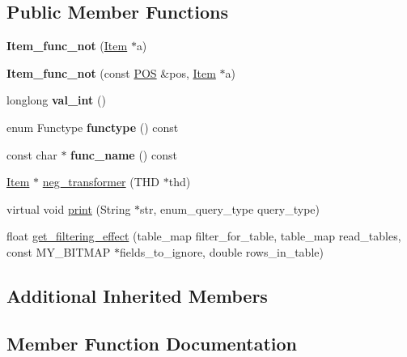 \subsection*{Public Member Functions}
\begin{DoxyCompactItemize}
\item 
\mbox{\label{classItem__func__not_a974b3e4bde716bd123b0055aacda011c}} 
{\bfseries Item\+\_\+func\+\_\+not} (\mbox{\hyperlink{classItem}{Item}} $\ast$a)
\item 
\mbox{\label{classItem__func__not_af71818c007710aac8b45670aa3038132}} 
{\bfseries Item\+\_\+func\+\_\+not} (const \mbox{\hyperlink{structYYLTYPE}{P\+OS}} \&pos, \mbox{\hyperlink{classItem}{Item}} $\ast$a)
\item 
\mbox{\label{classItem__func__not_af869072115f6ec06d7de76e80330aec5}} 
longlong {\bfseries val\+\_\+int} ()
\item 
\mbox{\label{classItem__func__not_a13182e0a3f186bf935e970a76a7a3ea6}} 
enum Functype {\bfseries functype} () const
\item 
\mbox{\label{classItem__func__not_a0a3f4c439efc9c1139b46987f9272bc8}} 
const char $\ast$ {\bfseries func\+\_\+name} () const
\item 
\mbox{\hyperlink{classItem}{Item}} $\ast$ \mbox{\hyperlink{classItem__func__not_abab1c235b067b74dda31f300a50104a4}{neg\+\_\+transformer}} (T\+HD $\ast$thd)
\item 
virtual void \mbox{\hyperlink{classItem__func__not_a2d11d511c9b23933c2615f703b6e38fa}{print}} (String $\ast$str, enum\+\_\+query\+\_\+type query\+\_\+type)
\item 
float \mbox{\hyperlink{classItem__func__not_a529dc3563de07479fbc0d9935bfda1ea}{get\+\_\+filtering\+\_\+effect}} (table\+\_\+map filter\+\_\+for\+\_\+table, table\+\_\+map read\+\_\+tables, const M\+Y\+\_\+\+B\+I\+T\+M\+AP $\ast$fields\+\_\+to\+\_\+ignore, double rows\+\_\+in\+\_\+table)
\end{DoxyCompactItemize}
\subsection*{Additional Inherited Members}


\subsection{Member Function Documentation}
\mbox{\label{classItem__func__not_a529dc3563de07479fbc0d9935bfda1ea}} 

